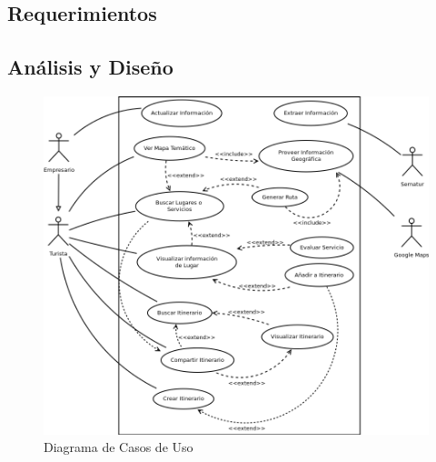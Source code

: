 \documentclass[12pt]{article}
\begin{document}
\subsection{Requerimientos}
\subsection{Análisis y Diseño	} 

\begin{center}\begin{figure}[htp]
\centering
\includegraphics[scale=0.4]{Diagrama1.png}
\caption{Diagrama de Casos de Uso}
\label{}
\end{figure} \end{center} 
\newpage
\end{document}
